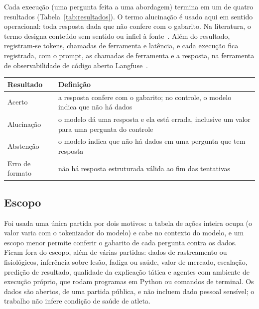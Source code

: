 Cada execução (uma pergunta feita a uma abordagem) termina em um de quatro resultados (Tabela~\ref{tab:resultados}).
O termo alucinação é usado aqui em sentido operacional: toda resposta dada que não confere com o gabarito. Na
literatura, o termo designa conteúdo sem sentido ou infiel à fonte~\cite{ji2023survey}.
Além do resultado, registram-se tokens, chamadas de ferramenta e latência, e cada execução fica registrada, com o
prompt, as chamadas de ferramenta e a resposta, na ferramenta de observabilidade de código aberto
Langfuse~\cite{langfuse}.

\vspace{2mm}
\noindent\begin{minipage}{\columnwidth}
\centering\small\renewcommand{\arraystretch}{1.15}
\begin{tabular}{>{\raggedright\arraybackslash}p{}>{\raggedright\arraybackslash}p{}} %
\toprule
Resultado & Definição \\
\midrule
Acerto & a resposta confere com o gabarito; no controle, o modelo indica que não há dados \\
Alucinação & o modelo dá uma resposta e ela está errada, inclusive um valor para uma pergunta do controle \\
Abstenção & o modelo indica que não há dados em uma pergunta que tem resposta \\
Erro de formato & não há resposta estruturada válida ao fim das tentativas \\
\bottomrule
\end{tabular}
\label{tab:resultados}
\end{minipage}\par\smallskip

\subsection{Escopo}

Foi usada uma única partida por dois motivos: a tabela de ações inteira ocupa \tokTableApprox{} (o valor varia com
o tokenizador do modelo) e cabe no contexto do modelo, e um escopo menor permite conferir o gabarito de cada
pergunta contra os dados. Ficam fora do escopo, além de várias partidas: dados de rastreamento ou fisiológicos,
inferência sobre lesão, fadiga ou saúde, valor de mercado, escalação, predição de resultado, qualidade da
explicação tática e agentes com ambiente de execução próprio, que rodam programas em Python ou comandos de
terminal. Os dados são abertos, de uma partida pública, e não incluem dado pessoal sensível; o trabalho não infere
condição de saúde de atleta.